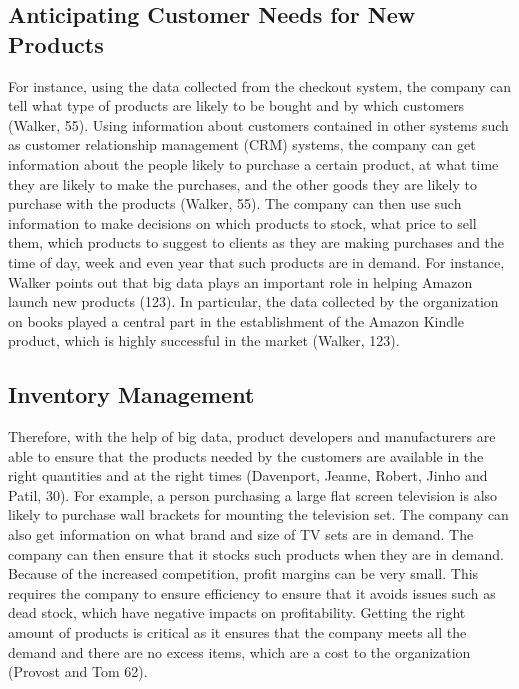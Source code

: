 \documentclass[sigconf]{acmart}
\begin{document}
\subsection{Anticipating Customer Needs for New Products}
For instance, using the data collected from the checkout system, the company can tell what type of products are likely to be bought and by which customers (Walker, 55). Using information about customers contained in other systems such as customer relationship management (CRM) systems, the company can get information about the people likely to purchase a certain product, at what time they are likely to make the purchases, and the other goods they are likely to purchase with the products (Walker, 55). The company can then use such information to make decisions on which products to stock, what price to sell them, which products to suggest to clients as they are making purchases and the time of day, week and even year that such products are in demand. For instance, Walker points out that big data plays an important role in helping Amazon launch new products (123). In particular, the data collected by the organization on books played a central part in the establishment of the Amazon Kindle product, which is highly successful in the market (Walker, 123).
\subsection{Inventory Management}
Therefore, with the help of big data, product developers and manufacturers are able to ensure that the products needed by the customers are available in the right quantities and at the right times (Davenport, Jeanne, Robert, Jinho and Patil, 30). For example, a person purchasing a large flat screen television is also likely to purchase wall brackets for mounting the television set. The company can also get information on what brand and size of TV sets are in demand. The company can then ensure that it stocks such products when they are in demand. Because of the increased competition, profit margins can be very small. This requires the company to ensure efficiency to ensure that it avoids issues such as dead stock, which have negative impacts on profitability. Getting the right amount of products is critical as it ensures that the company meets all the demand and there are no excess items, which are a cost to the organization (Provost and Tom 62). 
\end{document}
